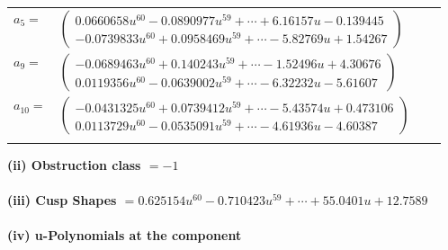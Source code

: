 \documentclass[1p]{elsarticle_modified}
\theoremstyle{definition}
\begin{document}
\begin{tabular}{m{7pt} m{180pt} m{7pt} m{180pt} }
\flushright $a_{5}=$&$\begin{pmatrix}0.0660658 u^{60}-0.0890977 u^{59}+\cdots+6.16157 u-0.139445\\-0.0739833 u^{60}+0.0958469 u^{59}+\cdots-5.82769 u+1.54267\end{pmatrix}$ \\
\flushright $a_{9}=$&$\begin{pmatrix}-0.0689463 u^{60}+0.140243 u^{59}+\cdots-1.52496 u+4.30676\\0.0119356 u^{60}-0.0639002 u^{59}+\cdots-6.32232 u-5.61607\end{pmatrix}$ \\
\flushright $a_{10}=$&$\begin{pmatrix}-0.0431325 u^{60}+0.0739412 u^{59}+\cdots-5.43574 u+0.473106\\0.0113729 u^{60}-0.0535091 u^{59}+\cdots-4.61936 u-4.60387\end{pmatrix}$\\&\end{tabular}
\flushleft \textbf{(ii) Obstruction class $= -1$}\\~\\
\flushleft \textbf{(iii) Cusp Shapes $= 0.625154 u^{60}-0.710423 u^{59}+\cdots+55.0401 u+12.7589$}\\~\\
\newpage\renewcommand{\arraystretch}{1}
\flushleft \textbf{(iv) u-Polynomials at the component}\newline \\
\end{document}
